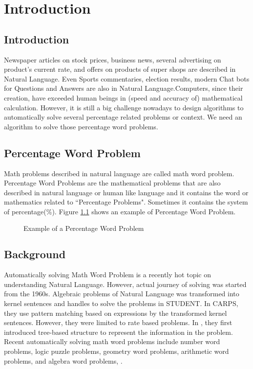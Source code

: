 \documentclass[document.tex]{subfiles}
\begin{document}
\chapter{Introduction}
\section{Introduction}
Newspaper articles on stock prices, business news, several advertising on product’s current rate, and offers on products of
super shops are described in Natural Language. Even Sports
commentaries, election results, modern Chat bots for Questions
and Answers are also in Natural Language.Computers, since their creation, have exceeded human beings in (speed and accuracy of) mathematical calculation. However, it is still a big challenge nowadays to design algorithms to automatically solve several percentage related problems or context. We need an algorithm to solve those percentage word problems.


\section{Percentage Word Problem}
\noindent Math problems described in natural language are called math word problem. Percentage Word Problems are the mathematical problems that are also described in natural language or human like language and it contains the word or mathematics related to ``Percentage Problems". Sometimes it contains the system of percentage(\%). Figure \ref{fig:a} shows an example of Percentage Word Problem.
\begin{figure}[H] 
	\caption{Example of a Percentage Word Problem}
	\label{fig:a}
\end{figure}
\section{Background}
\noindent Automatically solving Math Word Problem is a recently hot topic on understanding Natural Language. However, actual journey of solving was started from the 1960s. Algebraic problems of Natural Language was transformed into kernel sentences and handles to solve the problems in STUDENT\cite{4}. In CARPS\cite{5}, they use pattern matching based on expressions by the transformed kernel sentences. However, they were limited to rate based problems. In \cite{6}, they first introduced tree-based structure to represent the information in the problem. Recent automatically solving math word problems include number word problems\cite{7}, logic puzzle problems\cite{8}, geometry word problems\cite{9,10}, arithmetic word problems\cite{1}, \cite{11} and algebra word problems\cite{2,3}, \cite{12}.
\end{document}
